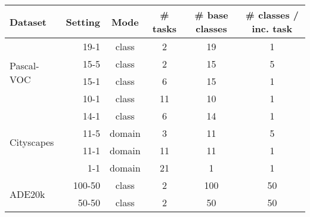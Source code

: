\begin{table}[t]
    \centering
    \begin{adjustbox}{max width=\textwidth}
        \begin{tabular}{@{}l|rcccc@{}}
            \toprule
            {\scriptsize Dataset}       & {\scriptsize Setting} & {\scriptsize Mode} & {\scriptsize \# tasks} & {\scriptsize \# base classes} & {\scriptsize \# classes / inc. task} \\
            \midrule
            \multirow{4}{*}{Pascal-VOC} & 19-1                  & class              & 2                      & 19                            & 1                                    \\
                                        & 15-5                  & class              & 2                      & 15                            & 5                                    \\
                                        & 15-1                  & class              & 6                      & 15                            & 1                                    \\
                                        & 10-1                  & class              & 11                     & 10                            & 1                                    \\
            \hline
            \multirow{4}{*}{Cityscapes} & 14-1                  & class              & 6                      & 14                            & 1                                    \\
                                        & 11-5                  & domain             & 3                      & 11                            & 5                                    \\
                                        & 11-1                  & domain             & 11                     & 11                            & 1                                    \\
                                        & 1-1                   & domain             & 21                     & 1                             & 1                                    \\
            \hline
            \multirow{4}{*}{ADE20k}     & 100-50                & class              & 2                      & 100                           & 50                                   \\
                                        & 50-50                 & class              & 2                      & 50                            & 50                                   \\

\end{tabular}
\end{adjustbox}
\end{table}
